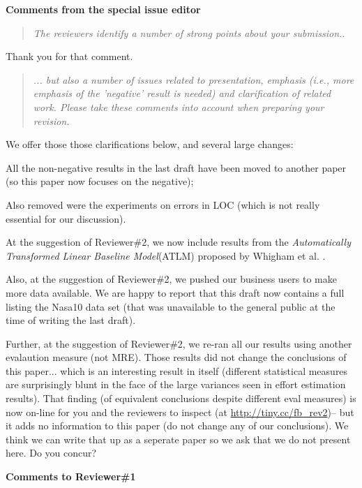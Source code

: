    \noindent
{\bf Comments from the special issue editor}

\begin{quote}{\em     The reviewers identify a number of strong points about your submission..}\end{quote}

\noindent
Thank you for that comment.

\begin{quote}{\em ... but also a number of issues related to presentation, emphasis (i.e., more emphasis of the 'negative' result is needed) and clarification of related work. Please take these comments into account when preparing your revision.}\end{quote}

\noindent We offer those those clarifications below, and several large changes:
\be
\item All the non-negative results in the last draft have been moved to another paper
  (so this paper now focuses on the negative);
\item Also removed were the experiments on errors in LOC (which is
  not really essential for our discussion).
  
\item
  At the suggestion of Reviewer\#2, we now include results from the
  \textit{Automatically Transformed Linear Baseline Model}(ATLM) proposed by Whigham et al. \cite{whigham15}.
\item Also, at the suggestion of Reviewer\#2, we pushed our business users to make
  more data available. We are happy to report that this draft now contains a full listing the Nasa10
  data set (that was unavailable to the general public at the time of writing the last draft).
\item Further, at the suggestion of Reviewer\#2, we re-ran all our results
  using another evalaution measure (not MRE). Those results did not change
  the conclusions of this paper... which is an interesting result in itself
  (different statistical measures are surprisingly blunt in the face
  of the large variances seen in effort estimation results). That finding (of
  equivalent conclusions despite different eval measures) is now on-line for
  you and the reviewers to inspect (at \url{http://tiny.cc/fb_rev2})-- but it adds no information to this
  paper (do not change any of our conclusions). We think we can write
  that up as a seperate paper so we ask that we do not
  present here.  Do you concur?
  \ee
  
\noindent
{\bf Comments to Reviewer\#1}

